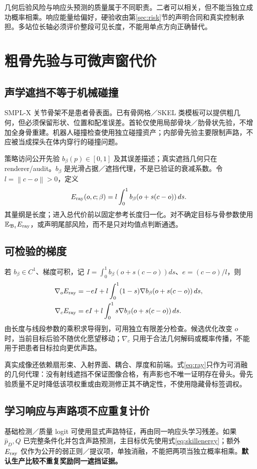 \documentclass[UTF8,fontset=fandol,11pt,a4paper]{ctexart}
\theoremstyle{plain}
\theoremstyle{definition}
\theoremstyle{remark}
\numberwithin{equation}{section}
\newcommand{\E}{\mathbb E}
\newcommand{\B}{\mathfrak B}
\newcommand{\norm}[1]{\left\lVert#1\right\rVert}
\begin{document}
几何后验风险与响应头预测的质量属于不同职责。二者可以相关，但不能当独立成功概率相乘。响应能量给偏好，硬验收由第\ref{sec:risk}节的声明合同和真实控制承担。多站位长轴必须评价整段可见长度，不能用单点方向正确替代。

\section{粗骨先验与可微声窗代价}
\label{sec:acoustic}
\subsection{声学遮挡不等于机械碰撞}
SMPL-X 关节骨架不是患者骨表面。已有骨网格／SKEL 类模板可以提供粗几何\cite{skel}，但必须保留形状、位置和配准误差。首轮仅使用局部骨块／肋骨状先验，不增加全身骨重建。机器人碰撞检查使用独立碰撞资产；内部骨先验主要限制声路，不应被当成探头在体内穿行的碰撞问题。

策略访问公开先验 $b_\beta(p)\in[0,1]$ 及其误差描述；真实遮挡几何只在 renderer/audit。$b_\beta$ 是光滑占据／遮挡代理，不是已验证的衰减系数。令 $l=\norm{c-o}>0$，定义
\begin{equation}
E_{\rm ray}(o,c;\beta)=l\int_0^1 b_\beta(o+s(c-o))\,ds.
\label{eq:ray}
\end{equation}
其量纲是长度；进入总代价前以固定参考长度归一化。对不确定目标与骨参数使用 $\E_{\B_t}E_{\rm ray}$，或声明尾部风险，而不是只对均值点判断通透。

\subsection{可检验的梯度}
若 $b_\beta\in C^1$、梯度可积，记 $I=\int_0^1b_\beta(o+s(c-o))ds$、$e=(c-o)/l$，则
\begin{align}
\nabla_o E_{\rm ray}&=-eI+l\int_0^1(1-s)\nabla b_\beta(o+s(c-o))\,ds,\\
\nabla_c E_{\rm ray}&= eI+l\int_0^1s\nabla b_\beta(o+s(c-o))\,ds.
\label{eq:raygradient}
\end{align}
由长度与线段参数的乘积求导得到，可用独立有限差分检查。候选优化改变 $o$ 时，当前目标后验不随优化愿望移动；$\nabla_c$ 只用于合法几何解码或概率传播，不能用于把患者目标拉向更优声路。

真实成像还依赖扇形束、入射界面、耦合、厚度和前端。式\eqref{eq:ray}只作为可消融的几何代理：没有射线遮挡不保证图像合格，有声影也不唯一证明存在骨头。骨先验质量不足时降低该项权重或由观测修正其不确定性，不使用隐藏骨标签调权。

\subsection{学习响应与声路项不应重复计价}
基础检测／质量 logit 可使用显式声路特征，再由同一响应头学习残差。如果 $\widehat p_D,Q$ 已完整条件化并包含声路预测，主目标优先使用式\eqref{eq:skillenergy}；额外 $E_{\rm ray}$ 仅作为公开的弱正则／提议项，单独消融，不能把两项当独立概率相乘。\textbf{默认生产比较不重复奖励同一遮挡证据。}
\end{document}

